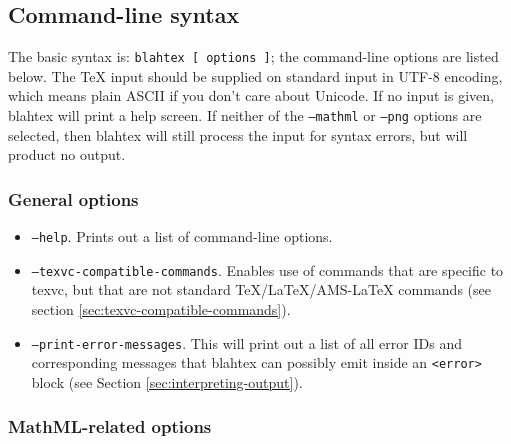 \documentclass{article}
\begin{document}
\subsection{Command-line syntax}\label{sec:command-line-syntax}

The basic syntax is: \texttt{blahtex [ options ]}; the command-line options are listed below. The \TeX{} input should be supplied on standard input in UTF-8 encoding, which means plain ASCII if you don't care about Unicode. If no input is given, blahtex will print a help screen. If neither of the \texttt{--mathml} or \texttt{--png} options are selected, then blahtex will still process the input for syntax errors, but will product no output.

\subsubsection{General options}

\begin{itemize}
\item \texttt{--help}. Prints out a list of command-line options.
\item \texttt{--texvc-compatible-commands}. Enables use of commands that are specific to texvc, but that are not standard \TeX{}/\LaTeX{}/AMS-\LaTeX{} commands (see section \ref{sec:texvc-compatible-commands}).
\item \texttt{--print-error-messages}. This will print out a list of all error IDs and corresponding messages that blahtex can possibly emit inside an \texttt{<error>} block (see Section \ref{sec:interpreting-output}).
\end{itemize}

\subsubsection{MathML-related options}
\end{document}
